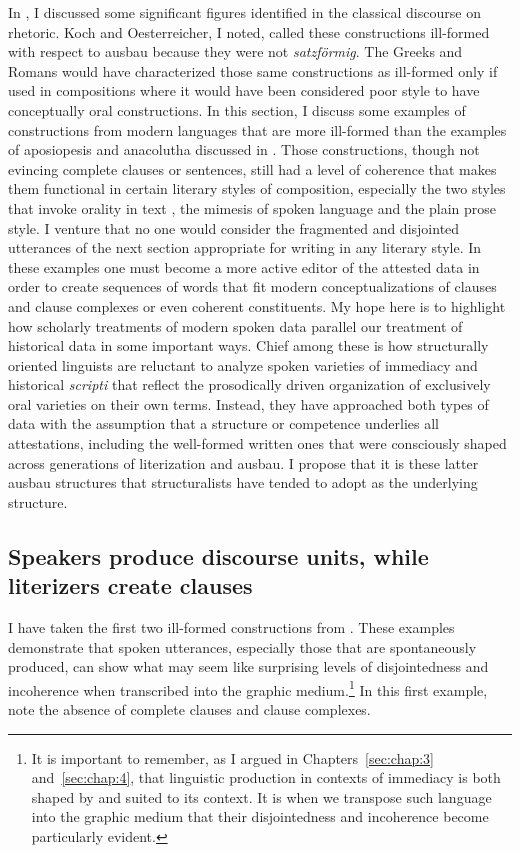 In , I discussed some significant figures identified in the classical discourse on rhetoric. Koch and Oesterreicher, I noted, called these constructions ill-formed with respect to ausbau because they were not \textit{satzförmig}. The Greeks and Romans would have characterized those same constructions as ill-formed only if used in compositions where it would have been considered poor style to have conceptually oral constructions. In this section, I discuss some examples of constructions from modern languages that are more ill-formed than the examples of aposiopesis and anacolutha discussed in \citet{KochOesterreicher1994}. Those constructions, though not evincing complete clauses or sentences, still had a level of coherence that makes them functional in certain literary styles of composition, especially the two styles that invoke orality in text \citep{Oesterreicher1997}, the mimesis of spoken language and the plain prose style. I venture that no one would consider the fragmented and disjointed utterances of the next section appropriate for writing in any literary style. In these examples one must become a more active editor of the attested data in order to create sequences of words that fit modern conceptualizations of clauses and clause complexes or even coherent constituents. My hope here is to highlight how scholarly treatments of modern spoken data parallel our treatment of historical data in some important ways. Chief among these is how structurally oriented linguists are reluctant to analyze spoken varieties of immediacy and historical \textit{scripti} that reflect the prosodically driven organization of exclusively oral varieties on their own terms. Instead, they have approached both types of data with the assumption that a structure or competence underlies all attestations, including the well-formed written ones that were consciously shaped across generations of literization and ausbau. I propose that it is these latter ausbau structures that structuralists have tended to adopt as the underlying structure.

\subsection{Speakers produce discourse units, while literizers create clauses }\label{sec:7.2.1}

I have taken the first two ill-formed constructions from  \citet[60]{MillerWeinert1998}. These examples demonstrate that spoken utterances, especially those that are spontaneously produced, can show what may seem like surprising levels of disjointedness and incoherence when transcribed into the graphic medium.\footnote{{It is important to remember, as I argued in Chapters~\ref{sec:chap:3} and~\ref{sec:chap:4}, that linguistic production in contexts of immediacy is both shaped by and suited to its context. It is when we transpose such language into the graphic medium that their disjointedness and incoherence become particularly evident.} } In this first example, note the absence of complete clauses and clause complexes.


